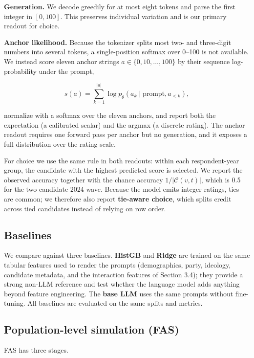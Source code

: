 \textbf{Generation.} We decode greedily for at most eight tokens and
parse the first integer in \([0,100]\). This preserves individual
variation and is our primary readout for choice.

\textbf{Anchor likelihood.} Because the tokenizer splits most two- and
three-digit numbers into several tokens, a single-position softmax over
0--100 is not available. We instead score eleven anchor strings
\(a\in\{0,10,\dots,100\}\) by their sequence log-probability under the
prompt,

\[
s(a)=\sum_{k=1}^{|a|}\log p_\theta\!\left(a_k \mid \text{prompt}, a_{<k}\right),
\]

normalize with a softmax over the eleven anchors, and report both the
expectation (a calibrated scalar) and the argmax (a discrete rating).
The anchor readout requires one forward pass per anchor but no
generation, and it exposes a full distribution over the rating scale.

For choice we use the same rule in both readouts: within each
respondent-year group, the candidate with the highest predicted score is
selected. We report the observed accuracy together with the chance
accuracy \(1/|\mathcal{C}(v,t)|\), which is 0.5 for the two-candidate
2024 wave. Because the model emits integer ratings, ties are common; we
therefore also report \textbf{tie-aware choice}, which splits credit
across tied candidates instead of relying on row order.

\subsection{Baselines}\label{baselines}

We compare against three baselines. \textbf{HistGB}
\citep{friedman2001gbm} and \textbf{Ridge} are trained on the same
tabular features used to render the prompts (demographics, party,
ideology, candidate metadata, and the interaction features of Section
3.4); they provide a strong non-LLM reference and test whether the
language model adds anything beyond feature engineering. The
\textbf{base LLM} uses the same prompts without fine-tuning. All
baselines are evaluated on the same splits and metrics.

\subsection{Population-level simulation
(FAS)}\label{population-level-simulation-fas}

FAS has three stages.

